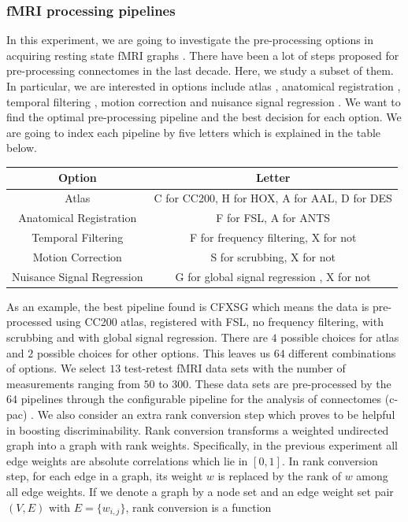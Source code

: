 \documentclass{article}
\begin{document}
\subsubsection{fMRI processing pipelines}
In this experiment, we are going to investigate the pre-processing options in acquiring resting state fMRI graphs \cite{huettel2004functional}. There have been a lot of steps proposed for pre-processing connectomes in the last decade. Here, we study a subset of them. In particular, we are interested in options include atlas \cite{mai2015atlas}, anatomical registration \cite{klein2009evaluation}, temporal filtering \cite{smith1999investigation}, motion correction \cite{power2012spurious} and nuisance signal regression \cite{fox2009global}. We want to find the optimal pre-processing pipeline and the best decision for each option. We are going to index each pipeline by five letters which is explained in the table below.   
\begin{center}
	\begin{tabular}{ |c|c| } 
		\hline
		Option & Letter  \\ \hline
		Atlas & C for CC200, H for HOX, A for AAL, D for DES \cite{craddock2012whole,desikan2006automated} \\ \hline
		Anatomical Registration & F for FSL, A for ANTS \cite{andersson2007non,avants2009advanced}\\ \hline
		Temporal Filtering & F for frequency filtering, X for not  \cite{smith1999investigation}\\ \hline
		Motion Correction & S for scrubbing, X for not  \cite{power2012spurious} \\ \hline
		Nuisance Signal Regression & G for global signal regression , X for not \cite{fox2009global} \\ \hline
	\end{tabular}
\end{center}
As an example, the best pipeline found is CFXSG which means the data is pre-processed using CC200 atlas, registered with FSL, no frequency filtering, with scrubbing and with global signal regression. There are $4$ possible choices for atlas and $2$ possible choices for other options. This leaves us $64$ different combinations of options. We select $13$ test-retest fMRI data sets with the number of measurements ranging from $50$ to $300$. These data sets are pre-processed by the $64$ pipelines through the configurable pipeline for the analysis of connectomes (c-pac) \cite{sikka2014towards}. We also consider an extra rank conversion step which proves to be helpful in boosting discriminability. Rank conversion transforms a weighted undirected graph into a graph with rank weights. Specifically, in the previous experiment all edge weights are absolute correlations which lie in $[0,1]$. In rank conversion step, for each edge in a graph, its weight $w$ is replaced by the rank of $w$ among all edge weights. If we denote a graph by a node set and an edge weight set pair $(V,E)$ with $E=\{w_{i,j}\}$, rank conversion is a function
\end{document}
